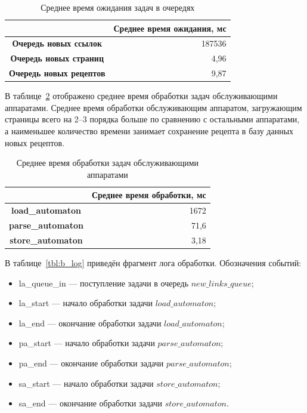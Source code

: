 \begin{table}[!ht]
	\centering
	\caption{Среднее время ожидания задач в очередях}
	\label{tab:queue-wait}
	\begin{tabular}{|c|r|}
		\hline
		\textbf{}                       & \multicolumn{1}{c|}{\textbf{Среднее время ожидания, мс}} \\ \hline
		\textbf{Очередь новых ссылок}   & 187536                                                   \\ \hline
		\textbf{Очередь новых страниц}  & 4,96                                                     \\ \hline
		\textbf{Очередь новых рецептов} & 9,87                                                     \\ \hline
	\end{tabular}
\end{table}

В таблице~\ref{tab:automaton-processing} отображено среднее время обработки задач обслуживающими аппаратами.
Среднее время обработки обслуживающим аппаратом, загружающим страницы всего на 2--3 порядка больше по сравнению с остальными аппаратами, а наименьшее количество времени занимает сохранение рецепта в базу данных новых рецептов.

\begin{table}[!ht]
	\centering
	\caption{Среднее время обработки задач обслуживающими аппаратами}
	\label{tab:automaton-processing}
	\begin{tabular}{|c|r|}
		\hline
		\textbf{}                & \multicolumn{1}{c|}{\textbf{Среднее время обработки, мс}} \\ \hline
		\textbf{load\_automaton}  & 1672                                                      \\ \hline
		\textbf{parse\_automaton} & 71,6                                                      \\ \hline
		\textbf{store\_automaton} & 3,18                                                      \\ \hline
	\end{tabular}
\end{table}

В таблице~\ref{tbl:b_log} приведён фрагмент лога обработки. Обозначения событий:
\begin{itemize}
    \item la\_queue\_in --- поступление задачи в очередь $new\_links\_queue$;
    \item la\_start --- начало обработки задачи $load\_automaton$;
    \item la\_end — окончание обработки задачи $load\_automaton$;
    \item pa\_start --- начало обработки задачи $parse\_automaton$;
    \item pa\_end — окончание обработки задачи $parse\_automaton$;
    \item sa\_start --- начало обработки задачи $store\_automaton$;
    \item sa\_end — окончание обработки задачи $store\_automaton$.
\end{itemize}

